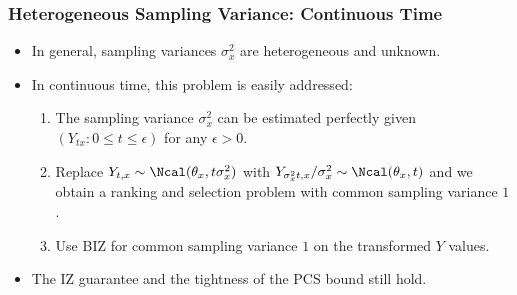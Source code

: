 {\begin{frame}
\frametitle{Heterogeneous Sampling Variance: Continuous Time}
\begin{itemize}
  \item In general, sampling variances $\sigma_x^2$ are heterogeneous and unknown.
  \item In continuous time, this problem is easily addressed:
    \begin{enumerate}
  \item The sampling variance $\sigma^2_x$ can be estimated perfectly given $(Y_{tx} : 0\le t \le \epsilon)$ for any $\epsilon > 0$. 
  \item Replace $Y_{t,x} \sim \Ncal(\theta_x,t\sigma^2_x)$ with $Y_{\sigma_x^2 t,x} / \sigma_x^2 \sim \Ncal(\theta_x,t)$ and we obtain a ranking and selection problem with common sampling variance $1$.
  \item Use BIZ for common sampling variance $1$ on the transformed $Y$ values.
\end{enumerate}
  \item The IZ guarantee and the tightness of the PCS bound still hold.
\end{itemize}
\end{frame}

}
